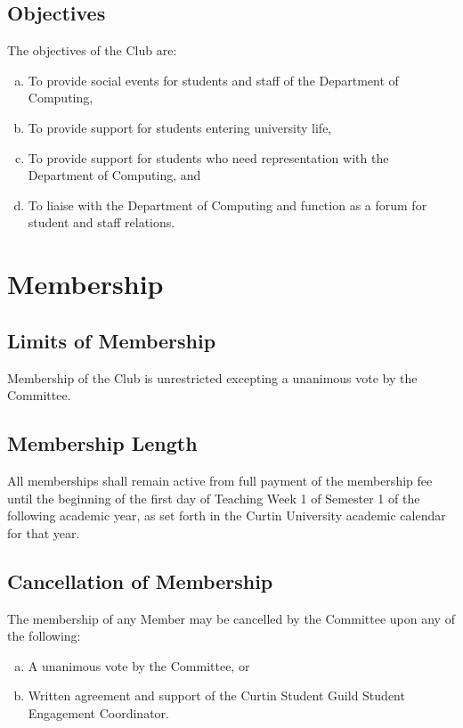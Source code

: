 \documentclass[a4paper,12pt]{article}
\begin{document}
\subsection{Objectives}

The objectives of the Club are:

\begin{enumerate}[a)]
	\item To provide social events for students and staff of the Department of Computing,
	\item To provide support for students entering university life,
	\item To provide support for students who need representation with the Department of Computing, and
	\item To liaise with the Department of Computing and function as a forum for student and staff relations.
\end{enumerate}

\section{Membership}

\subsection{Limits of Membership}

Membership of the Club is unrestricted excepting a unanimous vote by the Committee.

\subsection{Membership Length}

All memberships shall remain active from full payment of the membership fee until the beginning of the first day of Teaching Week 1 of Semester 1 of the following academic year, as set forth in the Curtin University academic calendar for that year.

\subsection{Cancellation of Membership}

The membership of any Member may be cancelled by the Committee upon any of the following:

\begin{enumerate}[a)]
	\item A unanimous vote by the Committee, or
	\item Written agreement and support of the Curtin Student Guild Student Engagement Coordinator.
\end{enumerate}
\end{document}

